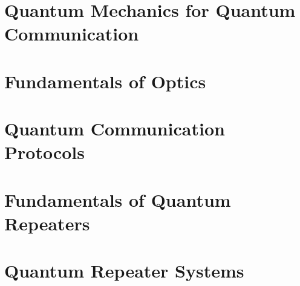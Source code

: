 \documentclass[6x9]{newmath}
\begin{document}



\part{Quantum Mechanics for Quantum Communication}






\part{Fundamentals of Optics}





\part{Quantum Communication Protocols}





\part{Fundamentals of Quantum Repeaters}





\part{Quantum Repeater Systems}




\endmatter


\endnotes

\nocite{*}



\printindex
\end{document}
